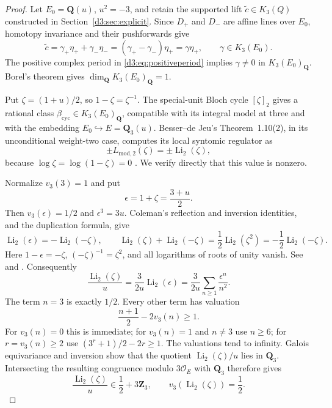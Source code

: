 \documentclass[11pt,a4paper]{amsart}
\numberwithin{equation}{section}
\theoremstyle{definition}
\theoremstyle{remark}
\newcommand{\Q}{\mathbf Q}
\newcommand{\Z}{\mathbf Z}
\newcommand{\OO}{\mathcal O}
\begin{document}
\begin{proof}
Let $E_0=\Q(u)$, $u^2=-3$, and retain the supported lift $\widetilde c\in K_3(Q)$ constructed in Section~\ref{d3:sec:explicit}. Since $D_+$ and $D_-$ are affine lines over $E_0$, homotopy invariance and their pushforwards give
\[
\widetilde c=\gamma_+\eta_++\gamma_-\eta_-
=(\gamma_+-\gamma_-)\eta_+=\gamma\eta_+,
\qquad \gamma\in K_3(E_0).
\]
The positive complex period in \eqref{d3:eq:positiveperiod} implies $\gamma\ne0$ in $K_3(E_0)_{\Q}$. Borel's theorem \cite[Proposition~12.2]{Borel} gives $\dim_{\Q}K_3(E_0)_{\Q}=1$.

Put $\zeta=(1+u)/2$, so $1-\zeta=\zeta^{-1}$. The special-unit Bloch cycle $[\zeta]_2$ gives a rational class $\beta_{\mathrm{cyc}}\in K_3(E_0)_{\Q}$, compatible with its integral model at three and with the embedding $E_0\hookrightarrow E=\Q_3(u)$. Besser--de Jeu's Theorem~1.10(2), in its unconditional weight-two case, computes its local syntomic regulator as
\[
\pm L_{\mathrm{mod},2}(\zeta)=\pm\operatorname{Li}_2(\zeta),
\]
because $\log\zeta=\log(1-\zeta)=0$ \cite{BesserDeJeu}. We verify directly that this value is nonzero.

Normalize $v_3(3)=1$ and put
\[
 \epsilon=1+\zeta=\frac{3+u}{2}.
\]
Then $v_3(\epsilon)=1/2$ and $\epsilon^3=3u$.
Coleman's reflection and inversion identities, and the duplication
formula, give
\[
 \operatorname{Li}_2(\epsilon)
 =-\operatorname{Li}_2(-\zeta),\qquad
 \operatorname{Li}_2(\zeta)+\operatorname{Li}_2(-\zeta)
 =\frac12\operatorname{Li}_2(\zeta^2)
 =-\frac12\operatorname{Li}_2(-\zeta).
\]
Here $1-\epsilon=-\zeta$, $( -\zeta)^{-1}=\zeta^2$,
and all logarithms of roots of unity vanish. See
\cite[equation~(1.2) and (2.4)]{BesserDeJeu}
and \cite[p.~377]{BesserDeJeuCurves}.
Consequently
\[
 \frac{\operatorname{Li}_2(\zeta)}u
 =\frac{3}{2u}\operatorname{Li}_2(\epsilon)
 =\frac{3}{2u}\sum_{n\geq1}\frac{\epsilon^n}{n^2}.
\]
The term $n=3$ is exactly $1/2$. Every other term has valuation
\[
 \frac{n+1}{2}-2v_3(n)\geq1.
\]
For $v_3(n)=0$ this is immediate; for $v_3(n)=1$ and $n\ne3$
use $n\geq6$; for $r=v_3(n)\geq2$ use
$(3^r+1)/2-2r\geq1$. The valuations tend to infinity.
Galois equivariance and inversion show that the quotient
$\operatorname{Li}_2(\zeta)/u$ lies in $\Q_3$.
Intersecting the resulting congruence modulo $3\OO_E$ with
$\Q_3$ therefore gives
\begin{equation}\label{d3:eq:localdilog}
\boxed{\quad
\frac{\operatorname{Li}_2(\zeta)}u\in\frac12+3\Z_3,
\qquad v_3(\operatorname{Li}_2(\zeta))=\frac12.
\quad}
\end{equation}


\end{proof}
\end{document}

